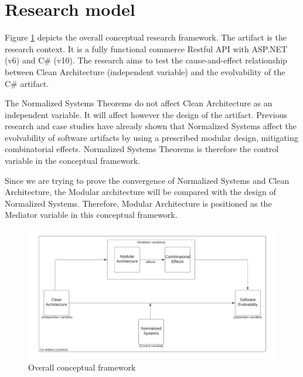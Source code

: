 \newpage \section{Research model} \label{research_model}

Figure \ref{fig_conceptual_framework} depicts the overall conceptual research framework.
The artifact is the research context. It is a fully functional commerce Restful API with
ASP.NET (v6) and C\# (v10). The research aims to test the cause-and-effect relationship
between Clean Architecture (independent variable) and the evolvability of the C\#
artifact.

The Normalized Systems Theorems do not affect Clean Architecture as an independent
variable. It will affect however the design of the artifact. Previous research and case
studies have already shown that Normalized Systems affect the evolvability of software
artifacts by using a prescribed modular design, mitigating combinatorial effects.
Normalized Systems Theorems is therefore the control variable in the conceptual framework.

Since we are trying to prove the convergence of Normalized Systems and Clean
Architecture, the Modular architecture will be compared with the design of Normalized
Systems. Therefore, Modular Architecture is positioned as the Mediator variable in this
conceptual framework.

\begin{figure}[!ht]
    \centering
    \includegraphics[width=1\textwidth]{Figures/conceptual_framework}
    \caption[Overall conceptual framework]{Overall conceptual framework}
    \label{fig_conceptual_framework}
\end{figure}
